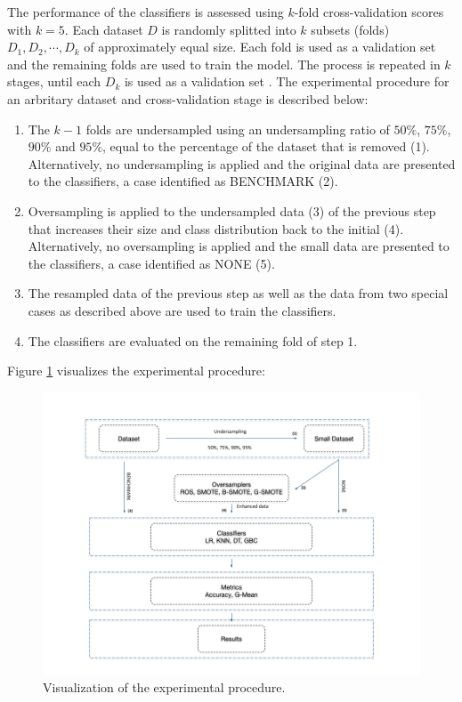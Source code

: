 \documentclass[parskip=full]{scrartcl}
\begin{document}
The performance of the classifiers is assessed using \(k \)-fold cross-validation scores with \( k = 5 \). Each dataset \( D \) is randomly splitted into \( k \) subsets (folds) \( D_1, D_2, \cdots, D_k \) of approximately equal size. Each fold is used as a validation set and the remaining folds are used to train the model. The process is repeated in \( k \) stages, until each \( D_k \) is used as a validation set \cite{Han.2012}. The experimental procedure for an arbritary dataset and cross-validation stage is described below:

\begin{enumerate}

	\item The \( k - 1 \) folds are undersampled using an undersampling ratio
	of $50\%$, $75\%$, $90\%$ and $95\%$, equal to the percentage of the dataset that is removed (1). Alternatively, no undersampling is applied and the original data are presented to the classifiers, a case identified as BENCHMARK (2).

	\item Oversampling is applied to the undersampled data (3) of the previous
	step that increases their size and class distribution back to the initial (4). Alternatively, no oversampling is applied and the small data are presented to the classifiers, a case identified as NONE (5).

	\item The resampled data of the previous step as well as the data from two special cases as described above are used to train the classifiers.
	
	\item The classifiers are evaluated on the remaining fold of step 1.

\end{enumerate}

 Figure \ref{fig:experimentalprocedure} visualizes the experimental procedure: 

\begin{figure}[H]
	\centering
	\includegraphics[width=1.0\linewidth]{../analysis/experimental_procedure.png}
	\caption{Visualization of the experimental procedure.}
	\label{fig:experimentalprocedure}
\end{figure}
\end{document}
